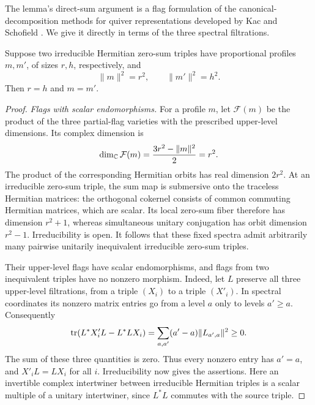 The lemma's direct-sum argument is a flag formulation of the
canonical-decomposition methods for quiver representations developed
by Kac and Schofield \cite{Kac1982,Schofield1992}. We give it directly
in terms of the three spectral filtrations.

\begin{lemma}\label{knot:profile-rigidity}
Suppose two irreducible Hermitian zero-sum triples have proportional
profiles \(m,m'\), of sizes \(r,h\), respectively, and
\[
 \|m\|^2=r^2,\qquad \|m'\|^2=h^2.
\]
Then \(r=h\) and \(m=m'\).
\end{lemma}

\begin{proof}
\emph{Flags with scalar endomorphisms.}
For a profile \(m\), let \(\mathcal F(m)\) be the product of the three
partial-flag varieties with the prescribed upper-level dimensions.
Its complex dimension is
\begin{equation}\label{knot:flag-dimension}
 \dim_\mathbb C\mathcal F(m)
 =\frac{3r^2-\|m\|^2}{2}=r^2.
\end{equation}
The product of the corresponding Hermitian orbits has real dimension
\(2r^2\).  At an irreducible zero-sum triple, the sum map is submersive
onto the traceless Hermitian matrices: the orthogonal cokernel consists
of common commuting Hermitian matrices, which are scalar.  Its local
zero-sum fiber therefore has dimension \(r^2+1\), whereas simultaneous
unitary conjugation has orbit dimension \(r^2-1\).  Irreducibility is
open.  It follows that these fixed spectra admit arbitrarily many
pairwise unitarily inequivalent irreducible zero-sum triples.

Their upper-level flags have scalar endomorphisms, and flags from two
inequivalent triples have no nonzero morphism.  Indeed, let \(L\)
preserve all three upper-level filtrations, from a triple \((X_i)\)
to a triple \((X'_i)\).  In spectral coordinates its nonzero matrix
entries go from a level \(a\) only to levels \(a'\ge a\).  Consequently
\[
 \operatorname{tr}(L^*X'_iL-L^*LX_i)
   =\sum_{a,a'}(a'-a)\|L_{a',a}\|^2\ge0.
\]
The sum of these three quantities is zero.  Thus every nonzero entry
has \(a'=a\), and \(X'_iL=LX_i\) for all \(i\).  Irreducibility now
gives the assertions.  Here an invertible complex intertwiner between
irreducible Hermitian triples is a scalar multiple of a unitary
intertwiner, since \(L^*L\) commutes with the source triple.


\end{proof}
